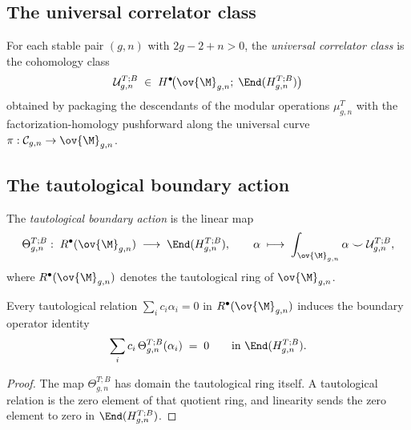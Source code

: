 \subsection{The universal correlator class}
\label{subsec:universal-correlator-class}

\begin{definition}
\label{def:universal-correlator-class}
For each stable pair $(g,n)$ with $2g-2+n > 0$, the \emph{universal correlator class} is
the cohomology class
\begin{equation}
\label{eq:universal-correlator-class}
\mathcal{U}_{g,n}^{T;B}
\;\in\;
H^\bullet\!\bigl(\ov{\M}_{g,n};\;\End(H_{g,n}^{T;B})\bigr)
\end{equation}
obtained by packaging the descendants of the modular operations $\mu_{g,n}^T$ with the
factorization-homology pushforward along the universal curve
$\pi: \mathcal{C}_{g,n} \to \ov{\M}_{g,n}$.
\end{definition}

\subsection{The tautological boundary action}
\label{subsec:tautological-boundary-action}

\begin{definition}
\label{def:tautological-boundary-action}
The \emph{tautological boundary action} is the linear map
\begin{equation}
\label{eq:tautological-action}
\Theta_{g,n}^{T;B}:\;
R^\bullet(\ov{\M}_{g,n})
\;\longrightarrow\;
\End(H_{g,n}^{T;B}),
\qquad
\alpha \;\longmapsto\;
\int_{\ov{\M}_{g,n}} \alpha \smile \mathcal{U}_{g,n}^{T;B},
\end{equation}
where $R^\bullet(\ov{\M}_{g,n})$ denotes the tautological ring of $\ov{\M}_{g,n}$.
\end{definition}

\begin{proposition}
\label{prop:tautological-boundary-relations}
Every tautological relation $\sum_i c_i \alpha_i = 0$ in $R^\bullet(\ov{\M}_{g,n})$
induces the boundary operator identity
\[
\sum_i c_i\,\Theta_{g,n}^{T;B}(\alpha_i) \;=\; 0
\qquad \text{in } \End(H_{g,n}^{T;B}).
\]
\end{proposition}

\begin{proof}
The map $\Theta_{g,n}^{T;B}$ has domain the tautological ring itself. A tautological
relation is the zero element of that quotient ring, and linearity sends the zero element
to zero in $\End(H_{g,n}^{T;B})$.
\end{proof}

